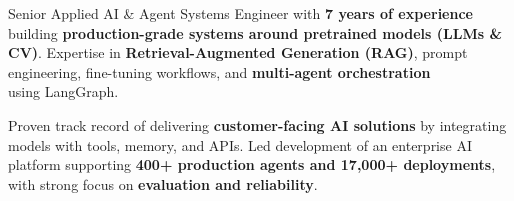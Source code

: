 \documentclass[11pt, a4paper]{awesome-cv}
\begin{document}
\makecvheader[C]

\vspace{-1.2em}

\begin{cvparagraph}
Senior Applied AI \& Agent Systems Engineer with \textbf{7 years of experience} building \textbf{production-grade systems around pretrained models (LLMs \& CV)}. Expertise in \textbf{Retrieval-Augmented Generation (RAG)}, prompt engineering, fine-tuning workflows, and \textbf{multi-agent orchestration} \\ using LangGraph.

Proven track record of delivering \textbf{customer-facing AI solutions} by integrating models with tools, memory, and APIs. Led development of an enterprise AI platform supporting \textbf{400+ production agents and 17,000+ deployments}, with strong focus on \textbf{evaluation and reliability}.
\end{cvparagraph}

\vspace{-1.3em}
\end{document}
